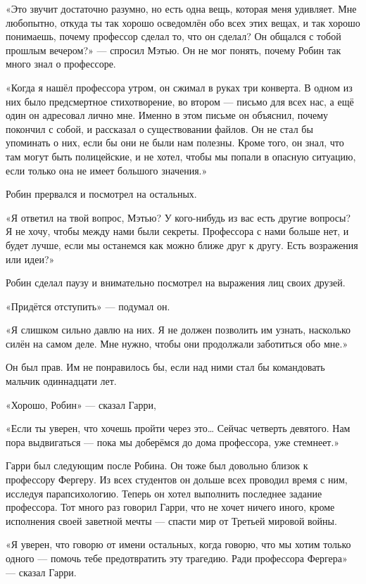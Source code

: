 \documentclass[a5paper, 9pt,
final, openany, twoside=true]{memoir}
\begin{document}
«Это звучит достаточно разумно, но есть одна вещь, которая меня удивляет. Мне любопытно, откуда ты так хорошо осведомлён обо всех этих вещах, и так хорошо понимаешь, почему профессор сделал то, что он сделал? Он общался с тобой прошлым вечером?» — спросил Мэтью. Он не мог понять, почему Робин так много знал о профессоре.

«Когда я нашёл профессора утром, он сжимал в руках три конверта. В одном из них было предсмертное стихотворение, во втором — письмо для всех нас, а ещё один он адресовал лично мне. Именно в этом письме он объяснил, почему покончил с собой, и рассказал о существовании файлов. Он не стал бы упоминать о них, если бы они не были нам полезны. Кроме того, он знал, что там могут быть полицейские, и не хотел, чтобы мы попали в опасную ситуацию, если только она не имеет большого значения.»

Робин прервался и посмотрел на остальных.

«Я ответил на твой вопрос, Мэтью? У кого-нибудь из вас есть другие вопросы? Я не хочу, чтобы между нами были секреты. Профессора с нами больше нет, и будет лучше, если мы останемся как можно ближе друг к другу. Есть возражения или идеи?»

Робин сделал паузу и внимательно посмотрел на выражения лиц своих друзей.

«Придётся отступить» — подумал он.

«Я слишком сильно давлю на них. Я не должен позволить им узнать, насколько силён на самом деле. Мне нужно, чтобы они продолжали заботиться обо мне.»

Он был прав. Им не понравилось бы, если над ними стал бы командовать мальчик одиннадцати лет.

«Хорошо, Робин» — сказал Гарри,

«Если ты уверен, что хочешь пройти через это… Сейчас четверть девятого. Нам пора выдвигаться — пока мы доберёмся до дома профессора, уже стемнеет.»

Гарри был следующим после Робина. Он тоже был довольно близок к профессору Фергеру. Из всех студентов он дольше всех проводил время с ним, исследуя парапсихологию. Теперь он хотел выполнить последнее задание профессора. Тот много раз говорил Гарри, что не хочет ничего иного, кроме исполнения своей заветной мечты — спасти мир от Третьей мировой войны.\bigskip

«Я уверен, что говорю от имени остальных, когда говорю, что мы хотим только одного — помочь тебе предотвратить эту трагедию. Ради профессора Фергера» — сказал Гарри.
\end{document}
